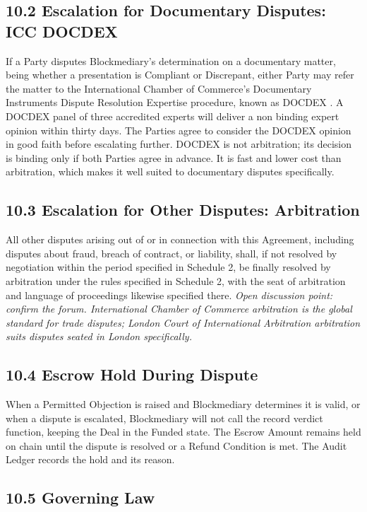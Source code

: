 \documentclass[12pt, a4paper]{article}
\begin{document}
\subsection*{10.2 Escalation for Documentary Disputes: ICC DOCDEX}

If a Party disputes Blockmediary's determination on a documentary matter, being whether a
presentation is Compliant or Discrepant, either Party may refer the matter to the
International Chamber of Commerce's Documentary Instruments Dispute Resolution Expertise
procedure, known as DOCDEX \citep{iccdocdex}. A DOCDEX panel of three accredited experts
will deliver a non binding expert opinion within thirty days. The Parties agree to
consider the DOCDEX opinion in good faith before escalating further. DOCDEX is not
arbitration; its decision is binding only if both Parties agree in advance. It is fast and
lower cost than arbitration, which makes it well suited to documentary disputes
specifically.

\subsection*{10.3 Escalation for Other Disputes: Arbitration}

All other disputes arising out of or in connection with this Agreement, including disputes
about fraud, breach of contract, or liability, shall, if not resolved by negotiation within
the period specified in Schedule 2, be finally resolved by arbitration under the rules
specified in Schedule 2, with the seat of arbitration and language of proceedings likewise
specified there. \textit{Open discussion point: confirm the forum. International Chamber
of Commerce arbitration is the global standard for trade disputes; London Court of
International Arbitration arbitration suits disputes seated in London specifically.}

\subsection*{10.4 Escrow Hold During Dispute}

When a Permitted Objection is raised and Blockmediary determines it is valid, or when a
dispute is escalated, Blockmediary will not call the record verdict function, keeping the
Deal in the Funded state. The Escrow Amount remains held on chain until the dispute is
resolved or a Refund Condition is met. The Audit Ledger records the hold and its reason.

\subsection*{10.5 Governing Law}
\end{document}
